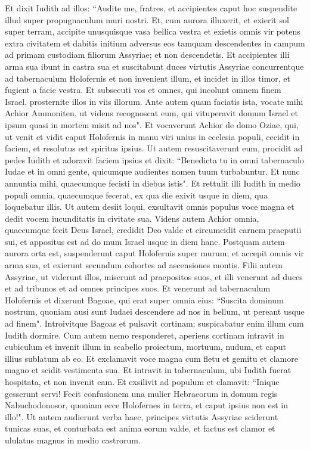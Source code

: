\begin{biblechapter}  
\verse Et dixit Iudith ad illos: “Audite me, fratres, et accipientes caput hoc suspendite illud super propugnaculum muri nostri. 
\verse Et, cum aurora illuxerit, et exierit sol super terram, accipite unusquisque vasa bellica vestra et exietis omnis vir potens extra civitatem et dabitis initium adversus eos tamquam descendentes in campum ad primam custodiam filiorum Assyriae; et non descendetis. 
\verse Et accipientes illi arma sua ibunt in castra sua et suscitabunt duces virtutis Assyriae concurrentque ad tabernaculum Holofernis et non invenient illum, et incidet in illos timor, et fugient a facie vestra. 
\verse Et subsecuti vos et omnes, qui incolunt omnem finem Israel, prosternite illos in viis illorum. 
\verse Ante autem quam faciatis ista, vocate mihi Achior Ammoniten, ut videns recognoscat eum, qui vituperavit domum Israel et ipsum quasi in mortem misit ad nos". 
\verse Et vocaverunt Achior de domo Oziae, qui, ut venit et vidit caput Holofernis in manu viri unius in ecclesia populi, cecidit in faciem, et resolutus est spiritus ipsius. 
\verse Ut autem resuscitaverunt eum, procidit ad pedes Iudith et adoravit faciem ipsius et dixit: “Benedicta tu in omni tabernaculo Iudae et in omni gente, quicumque audientes nomen tuum turbabuntur.  
\verse Et nunc annuntia mihi, quaecumque fecisti in diebus istis". Et rettulit illi Iudith in medio populi omnia, quaecumque fecerat, ex qua die exivit usque in diem, qua loquebatur illis. 
\verse Ut autem desiit loqui, exsultavit omnis populus voce magna et dedit vocem iucunditatis in civitate sua. 
\verse Videns autem Achior omnia, quaecumque fecit Deus Israel, credidit Deo valde et circumcidit carnem praeputii sui, et appositus est ad do mum Israel usque in diem hanc. 
\verse Postquam autem aurora orta est, suspenderunt caput Holofernis super murum; et accepit omnis vir arma sua, et exierunt secundum cohortes ad ascensiones montis. 
\verse Filii autem Assyriae, ut viderunt illos, miserunt ad praepositos suos, et illi venerunt ad duces et ad tribunos et ad omnes principes suos. 
\verse Et venerunt ad tabernaculum Holofernis et dixerunt Bagoae, qui erat super omnia eius: “Suscita dominum nostrum, quoniam ausi sunt Iudaei descendere ad nos in bellum, ut pereant usque ad finem". 
\verse Introivitque Bagoas et pulsavit cortinam; suspicabatur enim illum cum Iudith dormire. 
\verse Cum autem nemo responderet, aperiens cortinam intravit in cubiculum et invenit illum in scabello proiectum, mortuum, nudum, et caput illius sublatum ab eo. 
\verse Et exclamavit voce magna cum fletu et gemitu et clamore magno et scidit vestimenta sua. 
\verse Et intravit in tabernaculum, ubi Iudith fuerat hospitata, et non invenit eam. Et exsilivit ad populum et clamavit: 
\verse “Inique gesserunt servi! Fecit confusionem una mulier Hebraeorum in domum regis Nabuchodonosor, quoniam ecce Holofernes in terra, et caput ipsius non est in illo!". 
\verse Ut autem audierunt verba haec, principes virtutis Assyriae sciderunt tunicas suas, et conturbata est anima eorum valde, et factus est clamor et ululatus magnus in medio castrorum. 
\end{biblechapter}

